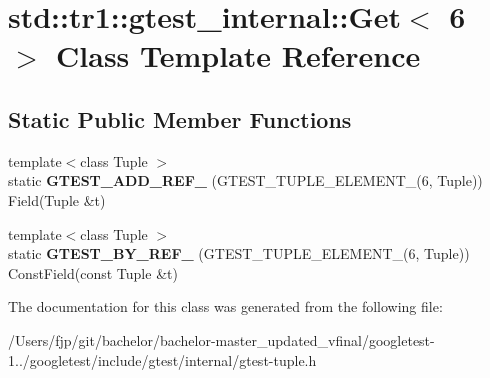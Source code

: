\hypertarget{classstd_1_1tr1_1_1gtest__internal_1_1_get_3_016_01_4}{}\section{std\+:\+:tr1\+:\+:gtest\+\_\+internal\+:\+:Get$<$ 6 $>$ Class Template Reference}
\label{classstd_1_1tr1_1_1gtest__internal_1_1_get_3_016_01_4}
\subsection*{Static Public Member Functions}
\begin{DoxyCompactItemize}
\item 
\mbox{\label{classstd_1_1tr1_1_1gtest__internal_1_1_get_3_016_01_4_a28034152d066c8644fa55e9fc0e3a12d}} 
{\footnotesize template$<$class Tuple $>$ }\\static {\bfseries G\+T\+E\+S\+T\+\_\+\+A\+D\+D\+\_\+\+R\+E\+F\+\_\+} (G\+T\+E\+S\+T\+\_\+\+T\+U\+P\+L\+E\+\_\+\+E\+L\+E\+M\+E\+N\+T\+\_\+(6, Tuple)) Field(Tuple \&t)
\item 
\mbox{\label{classstd_1_1tr1_1_1gtest__internal_1_1_get_3_016_01_4_a6e396b998757e0ab9b75db0c68a7c360}} 
{\footnotesize template$<$class Tuple $>$ }\\static {\bfseries G\+T\+E\+S\+T\+\_\+\+B\+Y\+\_\+\+R\+E\+F\+\_\+} (G\+T\+E\+S\+T\+\_\+\+T\+U\+P\+L\+E\+\_\+\+E\+L\+E\+M\+E\+N\+T\+\_\+(6, Tuple)) Const\+Field(const Tuple \&t)
\end{DoxyCompactItemize}


The documentation for this class was generated from the following file\+:\begin{DoxyCompactItemize}
\item 
/\+Users/fjp/git/bachelor/bachelor-\/master\+\_\+updated\+\_\+vfinal/googletest-\/1../googletest/include/gtest/internal/gtest-\/tuple.\+h\end{DoxyCompactItemize}
